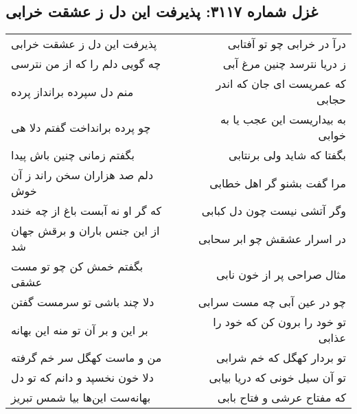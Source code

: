 \begin{center}
\section*{غزل شماره ۳۱۱۷: پذیرفت این دل ز عشقت خرابی}
\label{sec:3117}
\begin{longtable}{l p{0.5cm} r}
پذیرفت این دل ز عشقت خرابی
&&
درآ در خرابی چو تو آفتابی
\\
چه گویی دلم را که از من نترسی
&&
ز دریا نترسد چنین مرغ آبی
\\
منم دل سپرده برانداز پرده
&&
که عمریست ای جان که اندر حجابی
\\
چو پرده برانداخت گفتم دلا هی
&&
به بیداریست این عجب یا به خوابی
\\
بگفتم زمانی چنین باش پیدا
&&
بگفتا که شاید ولی برنتابی
\\
دلم صد هزاران سخن راند ز آن خوش
&&
مرا گفت بشنو گر اهل خطابی
\\
که گر او نه آبست باغ از چه خندد
&&
وگر آتشی نیست چون دل کبابی
\\
از این جنس باران و برقش جهان شد
&&
در اسرار عشقش چو ابر سحابی
\\
بگفتم خمش کن چو تو مست عشقی
&&
مثال صراحی پر از خون نابی
\\
دلا چند باشی تو سرمست گفتن
&&
چو در عین آبی چه مست سرابی
\\
بر این و بر آن تو منه این بهانه
&&
تو خود را برون کن که خود را عذابی
\\
من و ماست کهگل سر خم گرفته
&&
تو بردار کهگل که خم شرابی
\\
دلا خون نخسپد و دانم که تو دل
&&
تو آن سیل خونی که دریا بیابی
\\
بهانه‌ست این‌ها بیا شمس تبریز
&&
که مفتاح عرشی و فتاح بابی
\\
\end{longtable}
\end{center}
